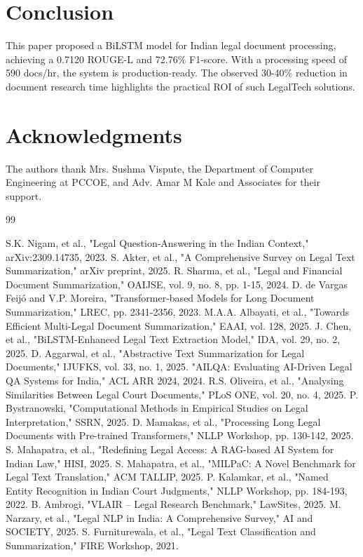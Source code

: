\documentclass[conference]{IEEEtran}
\begin{document}
\section{Conclusion}
This paper proposed a BiLSTM model for Indian legal document processing, achieving a 0.7120 ROUGE-L and 72.76\% F1-score. With a processing speed of 590 docs/hr, the system is production-ready. The observed 30-40\% reduction in document research time highlights the practical ROI of such LegalTech solutions.

\section*{Acknowledgments}
The authors thank Mrs. Sushma Vispute, the Department of Computer Engineering at PCCOE, and Adv. Amar M Kale and Associates for their support.

\begin{thebibliography}{99}

S.K. Nigam, et al., "Legal Question-Answering in the Indian Context," arXiv:2309.14735, 2023.
S. Akter, et al., "A Comprehensive Survey on Legal Text Summarization," arXiv preprint, 2025.
R. Sharma, et al., "Legal and Financial Document Summarization," OAIJSE, vol. 9, no. 8, pp. 1-15, 2024.
D. de Vargas Feijó and V.P. Moreira, "Transformer-based Models for Long Document Summarization," LREC, pp. 2341-2356, 2023.
M.A.A. Albayati, et al., "Towards Efficient Multi-Legal Document Summarization," EAAI, vol. 128, 2025.
J. Chen, et al., "BiLSTM-Enhanced Legal Text Extraction Model," IDA, vol. 29, no. 2, 2025.
D. Aggarwal, et al., "Abstractive Text Summarization for Legal Documents," IJUFKS, vol. 33, no. 1, 2025.
"AILQA: Evaluating AI-Driven Legal QA Systems for India," ACL ARR 2024, 2024.
R.S. Oliveira, et al., "Analysing Similarities Between Legal Court Documents," PLoS ONE, vol. 20, no. 4, 2025.
P. Bystranowski, "Computational Methods in Empirical Studies on Legal Interpretation," SSRN, 2025.
D. Mamakas, et al., "Processing Long Legal Documents with Pre-trained Transformers," NLLP Workshop, pp. 130-142, 2025.
S. Mahapatra, et al., "Redefining Legal Access: A RAG-based AI System for Indian Law," HISI, 2025.
S. Mahapatra, et al., "MILPaC: A Novel Benchmark for Legal Text Translation," ACM TALLIP, 2025.
P. Kalamkar, et al., "Named Entity Recognition in Indian Court Judgments," NLLP Workshop, pp. 184-193, 2022.
B. Ambrogi, "VLAIR – Legal Research Benchmark," LawSites, 2025.
M. Narzary, et al., "Legal NLP in India: A Comprehensive Survey," AI and SOCIETY, 2025.
S. Furniturewala, et al., "Legal Text Classification and Summarization," FIRE Workshop, 2021.

\end{thebibliography}
\end{document}
